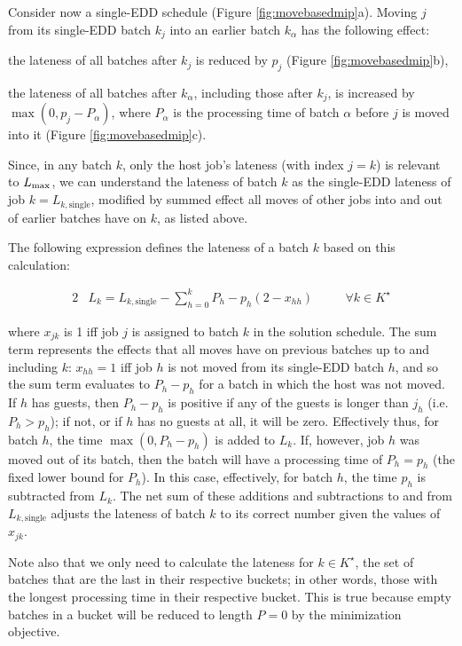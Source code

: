 \documentclass[13pt, letterpaper, oneside]{book}
\begin{document}


Consider now a single-EDD schedule (Figure \ref{fig:movebasedmip}a). Moving $j$ from its single-EDD batch $k_j$ into an earlier
batch $k_\alpha$ has the following effect:
\begin{alist}
\item{the lateness of all batches after $k_j$ is reduced by $p_j$ (Figure
\ref{fig:movebasedmip}b),}
\item{the lateness of all batches after $k_\alpha$, including those after $k_j$,
is increased by $\max(0,p_j - P_\alpha)$, where $P_\alpha$ is the processing
time of batch $\alpha$ before $j$ is moved into it (Figure
\ref{fig:movebasedmip}c).}
\end{alist}
Since, in any batch $k$, only the host job's lateness (with index $j = k$) is
relevant to $L_{\text{max}}$, we can understand the lateness of batch $k$ as the
single-EDD lateness of job $k = L_{k,\text{single}}$, modified by summed effect
all moves of other jobs into and out of earlier batches have on $k$, as listed
above.
 
The following expression defines the lateness of a batch $k$ based on this
calculation:
 
\begin{alignat}{2} & L_k = L_{k,\text{single}} - \sum_{h=0}^{k} P_h - p_h(2 -
x_{hh}) \quad && \forall k \in K^\star \end{alignat}
 
where $x_{jk}$ is 1 iff job $j$ is assigned to batch $k$ in the solution
schedule. The sum term represents the effects that all moves have on previous
batches up to and including $k$: $x_{hh} = 1$ iff job $h$ is not moved from
its single-EDD batch $h$, and so the sum term evaluates to $P_h - p_h$ for a
batch in which the host was not moved. If $h$ has guests, then $P_h - p_h$ is
positive if any of the guests is longer than $j_h$ (i.e. $P_h > p_h$); if not,
or if $h$ has no guests at all, it will be zero. Effectively thus, for batch
$h$, the time $\max(0, P_h-p_h)$ is added to $L_k$. If, however, job $h$ was
moved out of its batch, then the batch will have a processing time of $P_h =
p_h$ (the fixed lower bound for $P_h$). In this case, effectively, for batch
$h$, the time $p_h$ is subtracted from $L_k$. The net sum of these additions
and subtractions to and from $L_{k,\text{single}}$ adjusts the lateness of
batch $k$ to its correct number given the values of $x_{jk}$. 

Note also that we only need to calculate the lateness for $k \in K^\star$, the set
of batches that are the last in their respective buckets; in other words, those
with the longest processing time in their respective bucket. This is true
because empty batches in a bucket will be reduced to length $P = 0$ by the
minimization objective.
\end{document}

